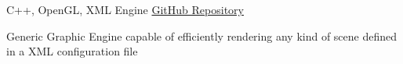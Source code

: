\begin{cventries}

\cventry
{C++, OpenGL, XML} %
  {Engine} %
{\href{https://github.com/JoseFilipeFerreira/engine}{GitHub Repository}} %
{} %
{ %
\begin{cvitems}
\item {Generic Graphic Engine capable of efficiently rendering any kind of scene
  defined in a XML configuration file}
\end{cvitems}
}


\end{cventries}
